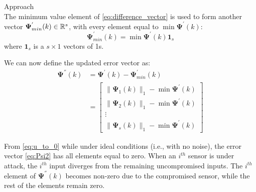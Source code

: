 \begin{section}{Approach}
\begin{equation}
	\end{equation}
The minimum value element of \eqref{eq:difference_vector} is used to form another vector $\bm{\Psi}^{'}_{min}(k) \in \mathbb{R}^s$, with every element equal to $\min \bm{\Psi}^{'}(k)$:
    \begin{equation}
	\bm{\Psi}^{'}_{min}(k)=\min \bm{\Psi}^{'}(k){\bm{1}}_s
	\end{equation}
	where ${\bm{1}}_s$ is a $s\times1$ vectors of 1s.

We can now define the updated error vector as:
    \begin{align}
    \label{eq:Psi2}
	\bm{\Psi}^{''}(k)&=\bm{\Psi}^{'}(k)-\bm{\Psi}^{'}_{min}(k) \\
	& =\begin{bmatrix} \lVert{\bm{\Psi}_1(k)}\rVert_1 - \min \bm{\Psi}^{'}(k)\\ \lVert{\bm{\Psi}_2(k)}\rVert_1 - \min \bm{\Psi}^{'}(k) \\ \vdots \\ \lVert{\bm{\Psi}_s(k)}\rVert_1 - \min \bm{\Psi}^{'}(k) \end{bmatrix}
	\end{align}
	
From \eqref{eq:u_to_0} while under ideal conditions (i.e., with no noise), the error vector \eqref{eq:Psi2} has all elements equal to zero. When an $i^{th}$ sensor is under attack, the $i^{th}$ input diverges from the remaining uncompromised inputs. The $i^{th}$ element of $\bm{\Psi}^{''}(k)$ becomes non-zero due to the compromised sensor, while the rest of the elements remain zero. 


\end{section}
